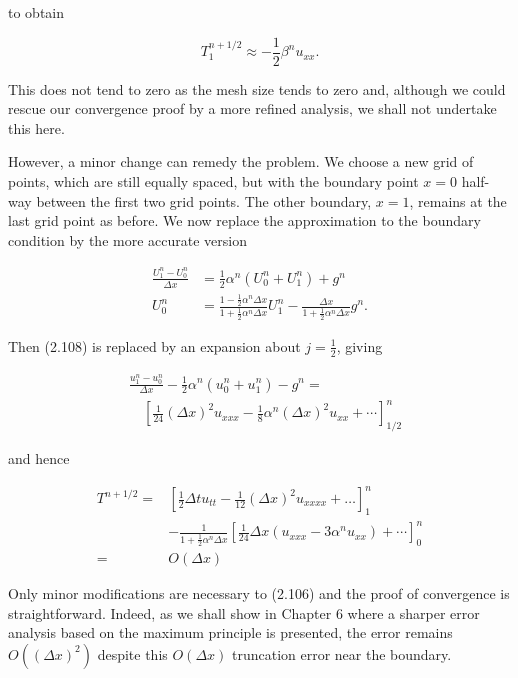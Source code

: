 \documentclass[10pt]{article}
\begin{document}
to obtain

\[
T_{1}^{n+1 / 2} \approx-\frac{1}{2} \beta^{n} u_{x x} .
\]

This does not tend to zero as the mesh size tends to zero and, although we could rescue our convergence proof by a more refined analysis, we shall not undertake this here.

However, a minor change can remedy the problem. We choose a new grid of points, which are still equally spaced, but with the boundary point \(x=0\) half-way between the first two grid points. The other boundary, \(x=1\), remains at the last grid point as before. We now replace the approximation to the boundary condition by the more accurate version

\[
\begin{aligned}
\frac{U_{1}^{n}-U_{0}^{n}}{\Delta x} & =\frac{1}{2} \alpha^{n}\left(U_{0}^{n}+U_{1}^{n}\right)+g^{n} \\
U_{0}^{n} & =\frac{1-\frac{1}{2} \alpha^{n} \Delta x}{1+\frac{1}{2} \alpha^{n} \Delta x} U_{1}^{n}-\frac{\Delta x}{1+\frac{1}{2} \alpha^{n} \Delta x} g^{n} .
\end{aligned}
\]

Then (2.108) is replaced by an expansion about \(j=\frac{1}{2}\), giving

\[
\begin{aligned}
& \frac{u_{1}^{n}-u_{0}^{n}}{\Delta x}-\frac{1}{2} \alpha^{n}\left(u_{0}^{n}+u_{1}^{n}\right)-g^{n}= \\
& \quad\left[\frac{1}{24}(\Delta x)^{2} u_{x x x}-\frac{1}{8} \alpha^{n}(\Delta x)^{2} u_{x x}+\cdots\right]_{1 / 2}^{n}
\end{aligned}
\]

and hence

\[
\begin{aligned}
T^{n+1 / 2}= & {\left[\frac{1}{2} \Delta t u_{t t}-\frac{1}{12}(\Delta x)^{2} u_{x x x x}+\ldots\right]_{1}^{n} } \\
& -\frac{1}{1+\frac{1}{2} \alpha^{n} \Delta x}\left[\frac{1}{24} \Delta x\left(u_{x x x}-3 \alpha^{n} u_{x x}\right)+\cdots\right]_{0}^{n} \\
= & O(\Delta x)
\end{aligned}
\]

Only minor modifications are necessary to (2.106) and the proof of convergence is straightforward. Indeed, as we shall show in Chapter 6 where a sharper error analysis based on the maximum principle is presented, the error remains \(O\left((\Delta x)^{2}\right)\) despite this \(O(\Delta x)\) truncation error near the boundary.
\end{document}
